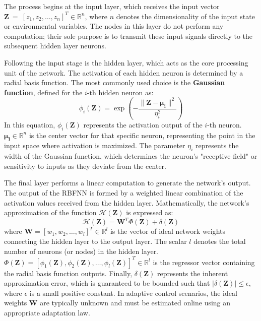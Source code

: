 The process begins at the input layer, which receives the input vector $\mathbf{Z}~=~[z_1, z_2, \dots, z_n]^T \in \mathbb{R}^n$, where $n$ denotes the dimensionality of the input state or environmental variables. The nodes in this layer do not perform any computation; their sole purpose is to transmit these input signals directly to the subsequent hidden layer neurons.

Following the input stage is the hidden layer, which acts as the core processing unit of the network. The activation of each hidden neuron is determined by a radial basis function. The most commonly used choice is the \textbf{Gaussian function}, defined for the $i$-th hidden neuron as:
\begin{equation}
    \phi_i(\mathbf{Z}) = \exp\left(-\frac{\|\mathbf{Z} - \mathbf{\mu_i}\|^2}{\eta_i^2}\right)
\end{equation}
In this equation, $\phi_i(\mathbf{Z})$ represents the activation output of the $i$-th neuron. $\mathbf{\mu_i} \in \mathbb{R}^n$ is the center vector for that specific neuron, representing the point in the input space where activation is maximized. The parameter $\eta_i$ represents the width of the Gaussian function, which determines the neuron's "receptive field" or sensitivity to inputs as they deviate from the center.

The final layer performs a linear computation to generate the network's output. The output of the RBFNN is formed by a weighted linear combination of the activation values received from the hidden layer. Mathematically, the network's approximation of the function $\mathcal{H}(\mathbf{Z})$ is expressed as:
\begin{equation}
    \mathcal{H}(\mathbf{Z}) = \mathbf{W}^T \Phi(\mathbf{Z}) + \delta(\mathbf{Z})
    \label{eq:rbfnn_approx}
\end{equation}
where $\mathbf{W} = [w_1, w_2, \dots, w_l]^T \in \mathbb{R}^l$ is the vector of ideal network weights connecting the hidden layer to the output layer. The scalar $l$ denotes the total number of neurons (or nodes) in the hidden layer. $\Phi(\mathbf{Z}) = [\phi_1(\mathbf{Z}), \phi_2(\mathbf{Z}), \dots, \phi_l(\mathbf{Z})]^T \in \mathbb{R}^l$ is the regressor vector containing the radial basis function outputs. Finally, $\delta(\mathbf{Z})$ represents the inherent approximation error, which is guaranteed to be bounded such that $|\delta(\mathbf{Z})| \le \epsilon$, where $\epsilon$ is a small positive constant. In adaptive control scenarios, the ideal weights $\mathbf{W}$ are typically unknown and must be estimated online using an appropriate adaptation law.

